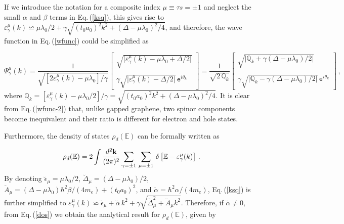 \documentclass[aps,prb,showpacs]{revtex4}
\newcommand{\mbb}{\mathbb}
\newcommand{\tet}{\texttt}
\begin{document}
If we introduce the notation for a composite index $\mu\equiv\tau s=\pm 1$ and neglect the small $\alpha$ and $\beta$ terms in Eq.\,(\ref{ksq}), this gives rise to 
$\varepsilon^\mu_{\gamma}(k)\backsimeq \mu\lambda_0/2+\gamma\sqrt{(t_0a_0)^2k^2+(\Delta-\mu\lambda_0)^2/4}$, and therefore, the wave function in Eq.\,(\ref{wfunc}) could be simplified as 

\begin{equation}
\Psi^\mu_\gamma (k)=\frac{1}{\sqrt{[2\varepsilon^\mu_{\gamma}(k) - \mu\lambda_0] /\gamma}} \left[
\begin{array}{c}
\sqrt{\vert \varepsilon^\mu_{\gamma}(k)-\mu\lambda_0 + \Delta/2 \vert} \\
\\
\gamma\sqrt{\vert \varepsilon^\mu_{\gamma}(k)-\Delta/2  \vert} \, \tet{e}^{i\theta_k}
\end{array}
\right] =  \frac{1}{\sqrt{2\, \mbb{Q}_k}} \left[
\begin{array}{c}
\sqrt{\vert\mbb{Q}_k + \gamma(\Delta - \mu\lambda_0)/2\vert } \\
\\
\gamma\sqrt{\vert\mbb{Q}_k - \gamma( \Delta-\mu\lambda_0 )/2\vert } \, \tet{e}^{i\theta_k}
\end{array}
\right] \, ,
\label{wfunc-2}
\end{equation}
where $\mbb{Q}_k  = [\varepsilon^\mu_{\gamma}(k) - \mu\lambda_0/2]/\gamma = \sqrt{(t_0a_0)^2k^2+(\Delta-\mu\lambda_0)^2/4}$. It is clear from Eq.\,(\ref{wfunc-2}) that,
unlike gapped graphene, two spinor components become inequivalent and their ratio is different for electron and hole states. 
\medskip

Furthermore, the density of states $\rho_d(\mbb{E})$ can be formally written as

\begin{equation}
\rho_d(\mbb{E})= 2\int \frac{d^2{\bf k}}{(2 \pi)^2} \sum\limits_{\gamma = \pm 1}\,\sum\limits_{\mu= \pm 1} \, \delta\left[ \mbb{E} -
\varepsilon^\mu_{\gamma}(k) \right] \, .
\label{dos}
\end{equation}
By denoting $\breve{\epsilon}_\mu=\mu\lambda_0/2$, $\breve{\Delta}_\mu=(\Delta -\mu\lambda_0)/2$,
$\breve{A}_\mu=(\Delta -\mu\lambda_0)\hbar^2 \beta /(4 m_e) + (t_0a_0)^2$, and $\breve{\alpha}=\hbar^2\alpha/(4m_e)$, Eq.\,(\ref{ksq}) is further simplified to
$\varepsilon^\mu_{\gamma}(k)\backsimeq\breve{\epsilon}_\mu+\breve{\alpha}\,k^2 + \gamma\sqrt{\breve{\Delta}_\mu^2 + \breve{A}_\mu k^2}$.
Therefore, if $\breve{\alpha}\neq 0$, from Eq.\,(\ref{dos}) we obtain the analytical result for $\rho_d(\mbb{E})$, given by
\end{document}
